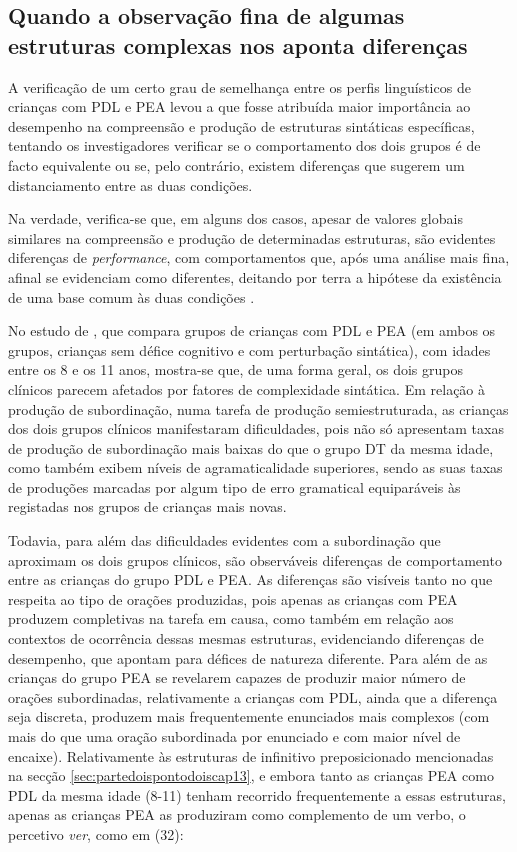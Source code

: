 \documentclass[output=paper,colorlinks,citecolor=brown,booklanguage=portuguese]{langscibook}
\begin{document}
\newpage
\subsection{Quando a observação fina de algumas estruturas complexas nos aponta diferenças}
A verificação de um certo grau de semelhança entre os perfis linguísticos de crianças com PDL e PEA levou a que fosse atribuída maior importância ao desempenho na compreensão e produção de estruturas sintáticas específicas, tentando os investigadores verificar se o comportamento dos dois grupos é de facto equivalente ou se, pelo contrário, existem diferenças que sugerem um distanciamento entre as duas condições. 

Na verdade, verifica-se que, em alguns dos casos, apesar de valores globais similares na compreensão e produção de determinadas estruturas, são evidentes diferenças de \emph{performance}, com comportamentos que, após uma análise mais fina, afinal se evidenciam como diferentes, deitando por terra a hipótese da existência de uma base comum às duas condições \citep{Whitehouse2008}. 

No estudo de \citet{Martinsempreparacao}, que compara grupos de crianças com PDL e PEA (em ambos os grupos, crianças sem défice cognitivo e com perturbação sintática), com idades entre os 8 e os 11 anos, mostra-se que, de uma forma geral, os dois grupos clínicos parecem afetados por fatores de complexidade sintática. Em relação à produção de subordinação, numa tarefa de produção semiestruturada, as crianças dos dois grupos clínicos manifestaram dificuldades, pois não só apresentam taxas de produção de subordinação mais baixas do que o grupo DT da mesma idade, como também exibem níveis de agramaticalidade superiores, sendo as suas taxas de produções marcadas por algum tipo de erro gramatical equiparáveis às registadas nos grupos de crianças mais novas.

Todavia, para além das dificuldades evidentes com a subordinação que aproximam os dois grupos clínicos, são observáveis diferenças de comportamento entre as crianças do grupo PDL e PEA. As diferenças são visíveis tanto no que respeita ao tipo de orações produzidas, pois apenas as crianças com PEA produzem completivas na tarefa em causa, como também em relação aos contextos de ocorrência dessas mesmas estruturas, evidenciando diferenças de desempenho, que apontam para défices de natureza diferente. Para além de as crianças do grupo PEA se revelarem capazes de produzir maior número de orações subordinadas, relativamente a crianças com PDL, ainda que a diferença seja discreta, produzem mais frequentemente enunciados mais complexos (com mais do que uma oração subordinada por enunciado e com maior nível de encaixe). Relativamente às estruturas de infinitivo preposicionado mencionadas na secção \ref{sec:partedoispontodoiscap13}, e embora tanto as crianças PEA como PDL da mesma idade (8-11) tenham recorrido frequentemente a essas estruturas, apenas as crianças PEA as produziram como complemento de um verbo, o percetivo \emph{ver}, como em (32):
\end{document}
